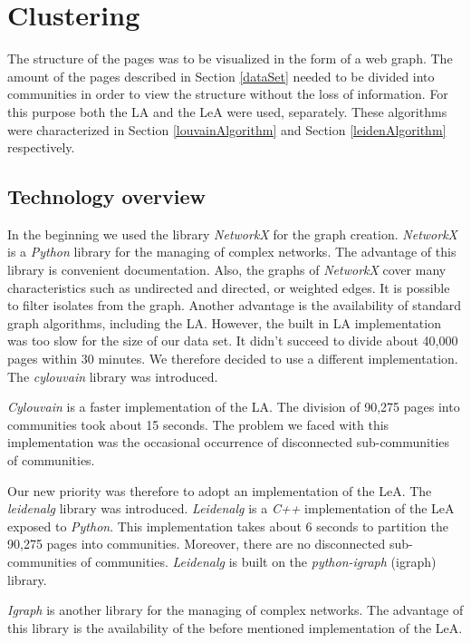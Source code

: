 \section{Clustering}\label{ClusteringDevelopment}
The structure of the pages was to be visualized in the form of a web graph. The amount of the pages described in Section \ref{dataSet} needed to be divided into communities in order to view the structure without the loss of information. For this purpose both the LA and the LeA were used, separately. These algorithms were characterized in Section \ref{louvainAlgorithm} and Section \ref{leidenAlgorithm} respectively. 

\subsection{Technology overview} \label{ClusteringTechonologyOverview}
In the beginning we used the library \textit{NetworkX} \cite{networkX} for the graph creation. \textit{NetworkX} is a \textit{Python} library for the managing of complex networks. The advantage of this library is convenient documentation. Also, the graphs of \textit{NetworkX} cover many characteristics such as undirected and directed, or weighted edges. It is possible to filter isolates from the graph. Another advantage is the availability of standard graph algorithms, including the LA. However, the built in LA implementation was too slow for the size of our data set. It didn't succeed to divide about 40,000 pages within 30 minutes. We therefore decided to use a different implementation. The \textit{cylouvain} library \cite{cylouvain} was introduced. 

\textit{Cylouvain} is a faster implementation of the LA. The division of 90,275 pages into communities took about 15 seconds. The problem we faced with this implementation was the occasional occurrence of disconnected sub-communities of communities. 

Our new priority was therefore to adopt an implementation of the LeA. The \textit{leidenalg} \cite{leidenalg} library was introduced. \textit{Leidenalg} is a \textit{C++} implementation of the LeA exposed to \textit{Python}. This implementation takes about 6 seconds to partition the 90,275 pages into communities. Moreover, there are no disconnected sub-communities of communities. \textit{Leidenalg} is built on the \textit{python-igraph} (igraph) library. 

\textit{Igraph} is another library for the managing of complex networks. The advantage of this library is the availability of the before mentioned implementation of the LeA.

